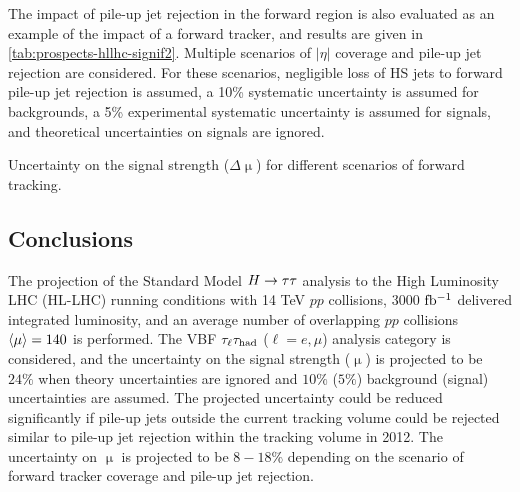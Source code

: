 The impact of pile-up jet rejection in the forward region is also evaluated as an example of the impact of a forward tracker, and results are given in \cref{tab:prospects-hllhc-signif2}. Multiple scenarios of $|\eta|$ coverage and pile-up jet rejection are considered. For these scenarios, negligible loss of HS jets to forward pile-up jet rejection is assumed, a 10\% systematic uncertainty is assumed for backgrounds, a 5\% experimental systematic uncertainty is assumed for signals, and theoretical uncertainties on signals are ignored.

\begin{table}[bp]
  \centering
  \renewcommand{\arraystretch}{1.4}
  \caption{Uncertainty on the signal strength ($\Delta\upmu$) for different scenarios of forward tracking.}
  
  \label{tab:prospects-hllhc-signif2}
\end{table}

\subsection{Conclusions}

The projection of the Standard Model $H\rightarrow\tau\tau$ analysis to the High Luminosity LHC (HL-LHC) running conditions with 14 TeV $pp$ collisions, 3000 $\mbox{fb$^{-1}$}$ delivered integrated luminosity, and an average number of overlapping $pp$ collisions $\langle\mu\rangle = 140$ is performed. The VBF $\tau_\ell\tau_\text{had}$ ($\ell = e,\mu$) analysis category is considered, and the uncertainty on the signal strength ($\upmu$) is projected to be $24\%$ when theory uncertainties are ignored and $10\%$ ($5\%$) background (signal) uncertainties are assumed. The projected uncertainty could be reduced significantly if pile-up jets outside the current tracking volume could be rejected similar to pile-up jet rejection within the tracking volume in 2012. The uncertainty on $\upmu$ is projected to be $8-18\%$ depending on the scenario of forward tracker coverage and pile-up jet rejection.

